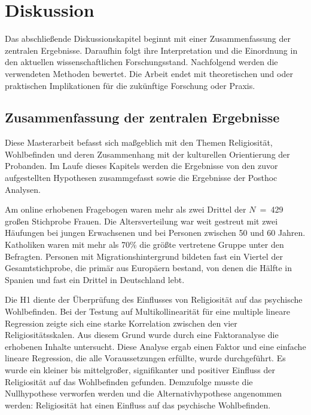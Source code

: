 \chapter{Diskussion}   \label{ch_5}
Das abschließende Diskussionskapitel beginnt mit einer Zusammenfassung der zentralen Ergebnisse. Daraufhin folgt ihre Interpretation und die Einordnung in den aktuellen wissenschaftlichen Forschungsstand. Nachfolgend werden die verwendeten Methoden bewertet. Die Arbeit endet mit theoretischen und oder praktischen Implikationen für die zukünftige Forschung oder Praxis.


\section{Zusammenfassung der zentralen Ergebnisse}  \label{sec_5.1}
Diese Masterarbeit befasst sich maßgeblich mit den Themen Religiosität,
Wohlbefinden und deren Zusammenhang mit der kulturellen Orientierung der Probanden. Im Laufe dieses Kapitels werden die Ergebnisse von den zuvor aufgestellten Hypothesen zusammgefasst sowie die Ergebnisse der Posthoc Analysen.

Am online erhobenen Fragebogen waren mehr als zwei Drittel der $N$~=~429 großen Stichprobe Frauen. Die Altersverteilung war weit gestreut mit zwei Häufungen bei jungen Erwachsenen und bei Personen zwischen 50 und 60 Jahren. Katholiken waren mit mehr als 70\% die größte vertretene Gruppe unter den Befragten. Personen mit Migrationshintergrund bildeten fast ein Viertel der Gesamtstichprobe, die primär aus Europäern bestand, von denen die Hälfte in Spanien und fast ein Drittel in Deutschland lebt.

Die H1 diente der Überprüfung des Einflusses von Religiosität auf das psychische Wohlbefinden. Bei der Testung auf Multikollinearität für eine multiple lineare Regression zeigte sich eine starke Korrelation zwischen den vier Religiositätsskalen. Aus diesem Grund wurde durch eine Faktoranalyse die erhobenen Inhalte untersucht. Diese Analyse ergab einen Faktor und eine einfache lineare Regression, die alle Voraussetzungen erfüllte, wurde durchgeführt. Es wurde ein kleiner bis mittelgroßer, signifikanter und positiver Einfluss der Religiosität auf das Wohlbefinden gefunden. Demzufolge musste die Nullhypothese verworfen werden und die Alternativhypothese angenommen werden: Religiosität hat einen Einfluss auf das psychische Wohlbefinden.

